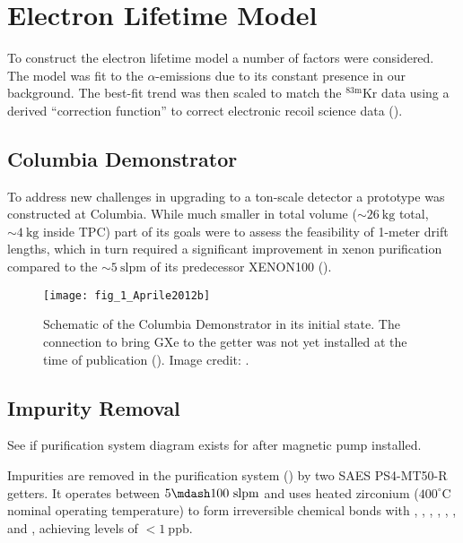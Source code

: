 \section{Electron Lifetime Model}
\label{sec:electron_lifetime_model}
To construct the electron lifetime model a number of factors were considered.  The model was fit to the  $\alpha$-emissions
due to its constant presence in our background.  The best-fit trend was then scaled to match the $\mathrm{^{83m}Kr}$ data using a derived
``correction function'' to correct electronic recoil science data ().



\subsection{Columbia Demonstrator}
\label{subsec:electron_lifetime_model_demonstrator}
To address new challenges in upgrading to a ton-scale detector a prototype was constructed at Columbia.  While much smaller in total
volume (${\sim}26\ \mathrm{kg}$ total, ${\sim}4\ \mathrm{kg}$ inside TPC) part of its goals were to assess the feasibility of 1-meter
drift lengths, which in turn required a significant improvement in xenon purification compared to the ${\sim}5\ \mathrm{slpm}$ of its
predecessor XENON100 ().

\begin{figure}
\centering
\texttt{[image: fig\_1\_Aprile2012b]}
\caption{Schematic of the Columbia Demonstrator in its initial state.  The connection to bring GXe to the getter was not yet installed
at the time of publication ().  Image credit: .}
\label{fig:electron_lifetime_model_demonstrator_schematic}
\end{figure}



\subsection{Impurity Removal}
\label{subsec:electron_lifetime_model_removal}
See if purification system diagram exists for after magnetic pump installed.

Impurities are removed in the purification system () by two SAES PS4-MT50-R getters.  It operates between
$5 \mdash 100\ \mathrm{slpm}$ and uses heated zirconium ($400^{\circ}\mathrm{C}$ nominal operating temperature) to form irreversible
chemical bonds with , , , , , , and , achieving levels of
$< 1\ \mathrm{ppb}$.

